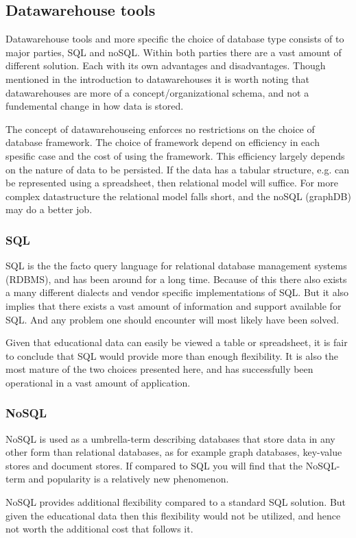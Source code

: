 \subsection{Datawarehouse tools}
Datawarehouse tools and more specific the choice of database type consists of to major parties, SQL and noSQL. 
Within both parties there are a vast amount of different solution. Each with its own advantages and disadvantages. 
Though mentioned in the introduction to datawarehouses it is worth noting that datawarehouses are more of a 
concept/organizational schema, and not a fundemental change in how data is stored. 

\bigskip\noindent
The concept of datawarehouseing enforces no restrictions on the choice of database framework.
The choice of framework depend on efficiency in each spesific case and the cost of using the framework.
This efficiency largely depends on the nature of data to be persisted.
If the data has a tabular structure, e.g. can be represented using a spreadsheet, then relational model will suffice. 
For more complex datastructure the relational model falls short, and the noSQL (graphDB) may do a better job.

\subsubsection{SQL}
	SQL is the the facto query language for relational database management systems (RDBMS), and has been around for a long time. 
	Because of this there also exists a many different dialects and vendor specific implementations of SQL. 
	But it also implies that there exists a vast amount of information and support available for SQL. 
	And any problem one should encounter will most likely have been solved.
	
	\bigskip\noindent
	Given that educational data can easily be viewed a table or spreadsheet, 
	it is fair to conclude that SQL would provide more than enough flexibility.
	It is also the most mature of the two choices presented here, and has successfully been operational in a vast amount of application.
	
	
\subsubsection{NoSQL}
	NoSQL is used as a umbrella-term describing databases that store data in any other form than relational databases, as 
	for example graph databases, key-value stores and document stores. 
	If compared to SQL you will find that the NoSQL-term and popularity is a relatively new phenomenon. 
	
	\bigskip\noindent
	NoSQL provides additional flexibility compared to a standard SQL solution. 
	But given the educational data then this flexibility would not be utilized, 
	and hence not worth the additional cost that follows it.





